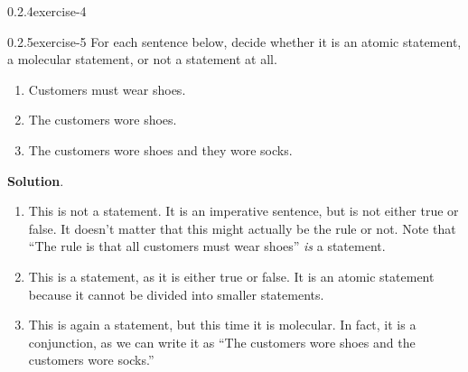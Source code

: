 \documentclass[twoside,11pt,]{book}
\numberwithin{equation}{chapter}
\begin{document}
\begin{divisionsolution}{0.2.4}{}{exercise-4}%
\end{divisionsolution}%
\begin{divisionsolution}{0.2.5}{}{exercise-5}%
\hypertarget{p-165}{}%
For each sentence below, decide whether it is an atomic statement, a molecular statement, or not a statement at all.\leavevmode%
\begin{enumerate}[label=(\alph*)]
\item\hypertarget{li-95}{}\hypertarget{p-166}{}%
Customers must wear shoes. %
\item\hypertarget{li-100}{}\hypertarget{p-167}{}%
The customers wore shoes. %
\item\hypertarget{li-105}{}\hypertarget{p-168}{}%
The customers wore shoes and they wore socks. %
\end{enumerate}
%
\par\smallskip%
\noindent\textbf{Solution}.\quad%
\hypertarget{p-169}{}%
\leavevmode%
\begin{enumerate}[label=(\alph*)]
\item\hypertarget{li-110}{}\hypertarget{p-170}{}%
This is not a statement. It is an imperative sentence, but is not either true or false. It doesn't matter that this might actually be the rule or not. Note that ``The rule is that all customers must wear shoes'' \emph{is} a statement.%
\item\hypertarget{li-111}{}\hypertarget{p-171}{}%
This is a statement, as it is either true or false. It is an atomic statement because it cannot be divided into smaller statements.%
\item\hypertarget{li-112}{}\hypertarget{p-172}{}%
This is again a statement, but this time it is molecular. In fact, it is a conjunction, as we can write it as ``The customers wore shoes and the customers wore socks.''%
\end{enumerate}
%
\end{divisionsolution}%
\end{document}
